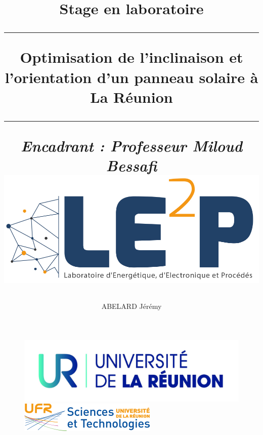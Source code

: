\documentclass[12pt,a4paper,openright]{report}
\author{ABELARD Jérémy}
\begin{document}
 \begin{titlepage}
  \begin{figure}
   \begin{center}
     \includegraphics[scale=0.1]{UR}
     \hspace{1.8cm}
     \includegraphics[scale=0.8]{logoFST}
  
   \end{center}
   \begin{center}
   
    \title{\vspace{3cm} %
    
   
  
    \textrm{\Large Stage en laboratoire}\\[2cm]
    {\hrule {\vspace{1cm}
     \textbf{Optimisation de l'inclinaison et l'orientation d'un panneau solaire à La Réunion}}
    \\[1cm]
    \hrule {\vspace{0.4cm}}}
    
     {\slshape Encadrant : Professeur Miloud Bessafi}\\[1cm]
     \includegraphics[scale=0.2]{le2p_fondtrans}
     {\vspace{3cm}}   }%
    

\end{center}
\end{figure}
\end{titlepage}
\end{document}
